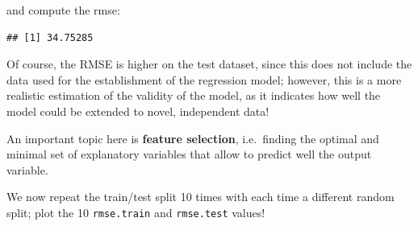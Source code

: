 \documentclass[
]{book}
\newenvironment{Shaded}{\begin{snugshade}}{\end{snugshade}}
\newcommand{\DecValTok}[1]{\textcolor[rgb]{0.00,0.00,0.81}{#1}}
\newcommand{\FunctionTok}[1]{\textcolor[rgb]{0.13,0.29,0.53}{\textbf{#1}}}
\newcommand{\NormalTok}[1]{#1}
\newcommand{\OtherTok}[1]{\textcolor[rgb]{0.56,0.35,0.01}{#1}}
\newcommand{\SpecialCharTok}[1]{\textcolor[rgb]{0.81,0.36,0.00}{\textbf{#1}}}
\begin{document}
and compute the rmse:

\begin{Shaded}
\end{Shaded}

\begin{verbatim}
## [1] 34.75285
\end{verbatim}

Of course, the RMSE is higher on the test dataset, since this does not include the data used for the establishment of the regression model; however, this is a more realistic estimation of the validity of the model, as it indicates how well the model could be extended to novel, independent data!

An important topic here is \textbf{feature selection}, i.e.~finding the optimal and minimal set of explanatory variables that allow to predict well the output variable.

We now repeat the train/test split 10 times with each time a different random split; plot the 10 \texttt{rmse.train} and \texttt{rmse.test} values!
\end{document}
